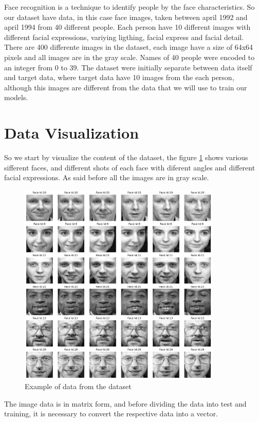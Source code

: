 \documentclass[conference]{IEEEtran}
\begin{document}
    Face recognition is a technique to identify people by the face characteristics. So our dataset \cite{dataset} have data, in this case face images, taken between april 1992 and april 1994 from 40 different people. Each person have 10 different images with different facial expressions, variying ligthing, facial express and facial detail. There are 400 differente images in the dataset, each image have a size of 64x64 pixels and all images are in the gray scale. Names of 40 people were encoded to an integer from 0 to 39. The dataset  were initially separate between data itself and target data, where target data have 10 images from the each person, although this images are different from the data that we will use to train our models.

    

\section{Data Visualization}

So we start by visualize the content of the dataset, the figure \ref{fig:example_of_data} shows various sifferent faces, and different shots of each face with diferent angles and different facial expressions. As said before all the images are in gray scale.

\begin{figure}
    \centering
    \includegraphics[width=3.8in]{visualization/example_data.png}
    \caption{Example of data from the dataset}
    \label{fig:example_of_data}
\end{figure}

The image data is in matrix form, and before dividing the data into test and training, it is necessary to convert the respective data into a vector.
\end{document}
